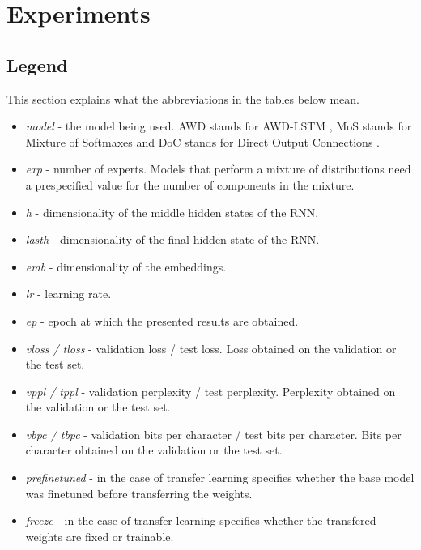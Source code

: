 \chapter{Experiments}

\section{Legend}
This section explains what the abbreviations in the tables below mean.

\begin{itemize}
    \item \emph{model} - the model being used. AWD stands for AWD-LSTM \citep{merity2017regularizing}, MoS \citep{yang2017breaking} stands for Mixture of Softmaxes and DoC stands for Direct Output Connections \citep{takase2018direct}.
    \item \emph{exp} - number of experts. Models that perform a mixture of distributions need a prespecified value for the number of components in the mixture.
    \item \emph{h} - dimensionality of the middle hidden states of the RNN.
    \item \emph{lasth} - dimensionality of the final hidden state of the RNN.
    \item \emph{emb} - dimensionality of the embeddings.
    \item \emph{lr} - learning rate.
    \item \emph{ep} - epoch at which the presented results are obtained.
    \item \emph{vloss / tloss} - validation loss / test loss. Loss obtained on the validation or the test set.
    \item \emph{vppl / tppl} - validation perplexity / test perplexity. Perplexity obtained on the validation or the test set.
    \item \emph{vbpc / tbpc} - validation bits per character / test bits per character. Bits per character obtained on the validation or the test set.
    \item \emph{prefinetuned} - in the case of transfer learning specifies whether the base model was finetuned before transferring the weights.
    \item \emph{freeze} - in the case of transfer learning specifies whether the transfered weights are fixed or trainable.
\end{itemize}

